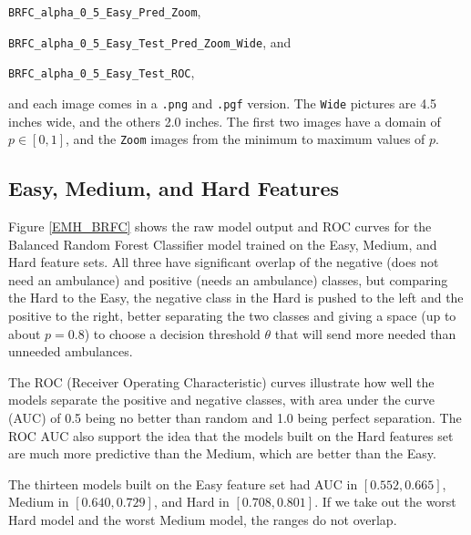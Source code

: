 \verb|BRFC_alpha_0_5_Easy_Pred_Zoom|,

\verb|BRFC_alpha_0_5_Easy_Test_Pred_Zoom_Wide|, and

\verb|BRFC_alpha_0_5_Easy_Test_ROC|, 

\noindent and each image comes in a \verb|.png| and \verb|.pgf| version.  The \verb|Wide| pictures are 4.5 inches wide, and the others 2.0 inches.  The first two images have a domain of $p \in [0,1]$, and the \verb|Zoom| images from the minimum to maximum values of $p$.  


\subsection{Easy, Medium, and Hard Features}
\label{results_EMH}

Figure \ref{EMH_BRFC} shows the raw model output and ROC curves for the Balanced Random Forest Classifier model trained on the Easy, Medium, and Hard feature sets.  All three have significant overlap of the negative (does not need an ambulance) and positive (needs an ambulance) classes, but comparing the Hard to the Easy, the negative class in the Hard is pushed to the left and the positive to the right, better separating the two classes and giving a space (up to about $p=0.8$) to choose a decision threshold $\theta$ that will send more needed than unneeded ambulances.  

The ROC (Receiver Operating Characteristic) curves illustrate how well the models separate the positive and negative classes, with area under the curve (AUC) of 0.5 being no better than random and 1.0 being perfect separation.  The ROC AUC also support the idea that the models built on the Hard features set are much more predictive than the Medium, which are better than the Easy.

The thirteen models built on the Easy feature set had AUC in $[0.552,0.665]$, Medium in $[0.640,0.729]$, 
and Hard in $[0.708,0.801]$.  If we take out the worst Hard model and the worst Medium model, the ranges do not overlap.  

